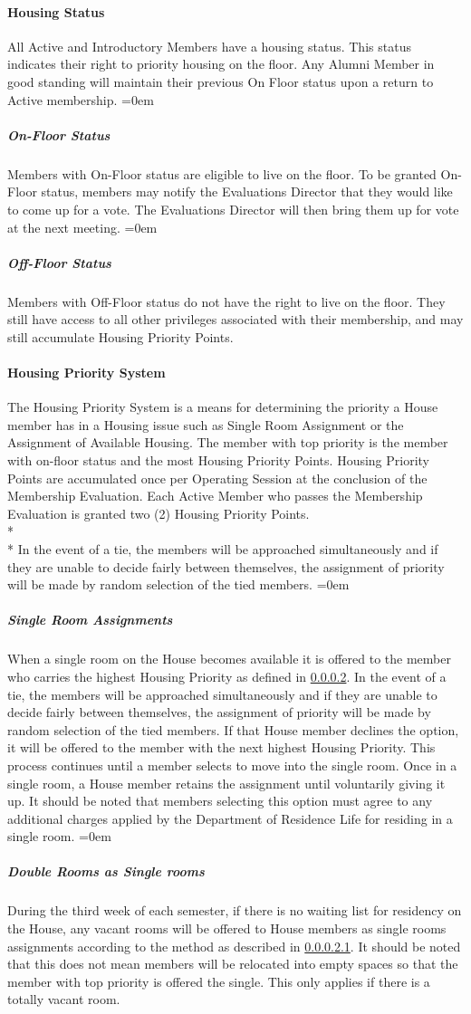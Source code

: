 \documentclass{article}
\newcommand{\asubsubsection}[1]{\paragraph{#1} \label{#1}}
\newcommand{\asubsubsubsection}[1]{\parindent=0em\subparagraph{#1} \label{#1}}
\begin{document}
\asubsubsection{Housing Status}
All Active and Introductory Members have a housing status.
This status indicates their right to priority housing on the floor.
Any Alumni Member in good standing will maintain their previous On Floor status upon a return to Active membership.
\asubsubsubsection{On-Floor Status}
Members with On-Floor status are eligible to live on the floor.
To be granted On-Floor status, members may notify the Evaluations Director that they would like to come up for a vote.
The Evaluations Director will then bring them up for vote at the next meeting.
\asubsubsubsection{Off-Floor Status}
Members with Off-Floor status do not have the right to live on the floor.
They still have access to all other privileges associated with their membership, and may still accumulate Housing Priority Points.

\asubsubsection{Housing Priority System}
The Housing Priority System is a means for determining the priority a House member has in a Housing issue such as Single Room Assignment or the Assignment of Available Housing.
The member with top priority is the member with on-floor status and the most Housing Priority Points.
Housing Priority Points are accumulated once per Operating Session at the conclusion of the Membership Evaluation. Each Active Member who passes the Membership Evaluation is granted two (2) Housing Priority Points.
\\* \\*
In the event of a tie, the members will be approached simultaneously and if they are unable to decide fairly between themselves, the assignment of priority will be made by random selection of the tied members.
\asubsubsubsection{Single Room Assignments}
When a single room on the House becomes available it is offered to the member who carries the highest Housing Priority as defined in \ref{Housing Priority System}.
In the event of a tie, the members will be approached simultaneously and if they are unable to decide fairly between themselves, the assignment of priority will be made by random selection of the tied members.
If that House member declines the option, it will be offered to the member with the next highest Housing Priority.
This process continues until a member selects to move into the single room.
Once in a single room, a House member retains the assignment until voluntarily giving it up.
It should be noted that members selecting this option must agree to any additional charges applied by the Department of Residence Life for residing in a single room.
\asubsubsubsection{Double Rooms as Single rooms}
During the third week of each semester, if there is no waiting list for residency on the House, any vacant rooms will be offered to House members as single rooms assignments according to the method as described in \ref{Single Room Assignments}.
It should be noted that this does not mean members will be relocated into empty spaces so that the member with top priority is offered the single.
This only applies if there is a totally vacant room.
\end{document}
